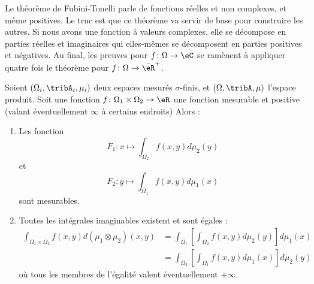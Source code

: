 Le théorème de Fubini-Tonelli parle de fonctions réelles et non complexes, et même positives. Le truc est que ce théorème va servir de base pour construire les autres. Si nous avons une fonction à valeurs complexes, elle se décompose en parties réelles et imaginaires qui elles-mêmes se décomposent en parties positives et négatives. Au final, les preuves pour \( f\colon \Omega\to \eC\) se ramènent à appliquer quatre fois le théorème pour \( f\colon \Omega\to \bar \eR^+\).
\begin{theorem}\label{ThoWTMSthY}
    Soient \( (\Omega_i,\tribA_i,\mu_i)\) deux espaces mesurés \( \sigma\)-finis, et \( (\Omega,\tribA,\mu)\) l'espace produit. Soit une fonction \( f\colon \Omega_1\times \Omega_2\to \eR\) une fonction mesurable et positive (valant éventuellement \( \infty\) à certains endroits)
    Alors :
    \begin{enumerate}
        \item       \label{ITEMooUTMNooVIBdpP}
            Les fonction
            \begin{equation}        \label{EQooWLADooQwNhEy}
                F_1\colon x\mapsto \int_{\Omega_2}f(x,y)d\mu_2(y)
            \end{equation}
            et
            \begin{equation}
                F_2\colon y\mapsto \int_{\Omega_1}f(x,y)d\mu_1(x)
            \end{equation}
            sont mesurables.
        \item   \label{ITEMooFKQUooCoCOLV}
            Toutes les intégrales imaginables existent et sont égales :
            \begin{subequations}    \label{EqJRVtOGx}
                \begin{align}
                    \int_{\Omega_1\times \Omega_2}f(x,y)d(\mu_1\otimes \mu_2)(x,y)&=\int_{\Omega_1}\left[ \int_{\Omega_2}f(x,y)d\mu_2(y) \right]d\mu_1(x)\\
                &=\int_{\Omega_2}\left[ \int_{\Omega_1}f(x,y)d\mu_1(x) \right]d\mu_2(y)
                \end{align}
            \end{subequations}
            où tous les membres de l'égalité valent éventuellement \( +\infty\).
    \end{enumerate}
\end{theorem}


